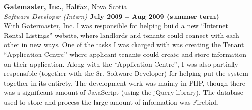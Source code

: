 \documentclass[margin,line]{resume}
\begin{document}
\begin{resume}

	\newpage

	{\bf Gatemaster, Inc.}, Halifax, Nova Scotia \vspace{2mm}\\\vspace{1mm}%
	{\sl Software Developer (Intern)} \hfill {\bf July 2009 -- Aug 2009 (summer term)}\\
	With Gatermaster, Inc. I was responsible for helping build a new ``Internet Rental Listings'' website, where landlords and tenants could connect with each other in new ways. One of the tasks I was charged with was creating the Tenant ``Application Centre'' where applicant tenants could create and store information on their application. Along with the ``Application Centre'', I was also partially responsible (together with the Sr. Software Developer) for helping put the system together in its entirety. The development work was mainly in PHP, though there was a significant amount of JavaScript (using the jQuery library). The database used to store and process the large amount of information was Firebird.


\end{resume}
\end{document}
